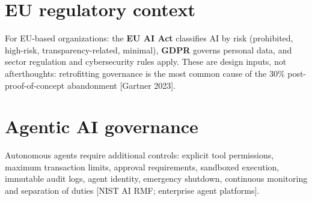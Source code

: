 \section{EU regulatory context}

For EU-based organizations: the \textbf{EU AI Act} classifies AI by risk
(prohibited, high-risk, transparency-related, minimal), \textbf{GDPR} governs
personal data, and sector regulation and cybersecurity rules apply. These are
design inputs, not afterthoughts: retrofitting governance is the most common
cause of the 30\% post-proof-of-concept abandonment [Gartner 2023].

\section{Agentic AI governance}

Autonomous agents require additional controls: explicit tool permissions,
maximum transaction limits, approval requirements, sandboxed execution,
immutable audit logs, agent identity, emergency shutdown, continuous
monitoring and separation of duties [NIST AI RMF; enterprise agent platforms].
